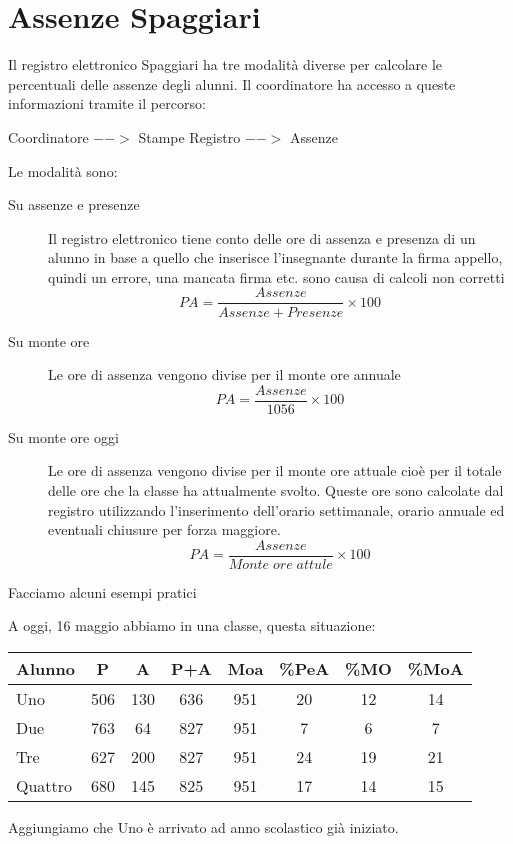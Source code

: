 \documentclass{article}
\begin{document}
\section*{Assenze Spaggiari}
Il registro elettronico Spaggiari  ha tre modalità diverse per calcolare le percentuali delle assenze degli alunni. Il coordinatore ha accesso a queste informazioni tramite il percorso:

Coordinatore $-->$ Stampe Registro $-->$ Assenze 

Le modalità sono:
\begin{description}
	\item[Su assenze e presenze] Il registro elettronico tiene conto delle ore di assenza e presenza di un alunno  in base a quello che inserisce l'insegnante durante la firma appello, quindi un errore, una mancata firma etc. sono causa di  calcoli non corretti \[PA=\dfrac{Assenze}{Assenze+Presenze}\times 100\]
	\item[Su monte ore] Le ore di assenza vengono divise per il monte ore annuale \[PA=\dfrac{Assenze}{1056}\times 100\]
	\item[Su monte ore oggi] Le ore di assenza vengono divise per il monte ore attuale cioè per il totale delle ore che la classe ha attualmente svolto. Queste ore sono calcolate dal registro utilizzando l'inserimento dell'orario settimanale, orario annuale ed eventuali chiusure per forza maggiore.   \[PA=\dfrac{Assenze}{Monte\; ore\; attule}\times 100\]
\end{description}
Facciamo alcuni esempi pratici

A oggi, 16 maggio abbiamo in una classe, questa situazione:

\begin{center}
	\begin{tabular}{|l|c|c|c|c|c|c|c|}
	\hline
Alunno	& P & A &  P+A &Moa & \%PeA & \%MO & \%MoA   \\
	\hline
Uno	& 506 & 130& 636 & 951 & 20 & 12 & 14   \\
	\hline
Due	&763  &64&827  & 951 &7  & 6 &  7  \\
	\hline
Tre	&627  &200&827  & 951 &24  & 19 &  21  \\
	\hline
Quattro	&680  &145&825  & 951 &17  & 14 &  15  \\
\hline
\end{tabular} 
\end{center}
Aggiungiamo che Uno è arrivato ad anno scolastico già iniziato.
\nocite{*}
\printbibliography
\end{document}
